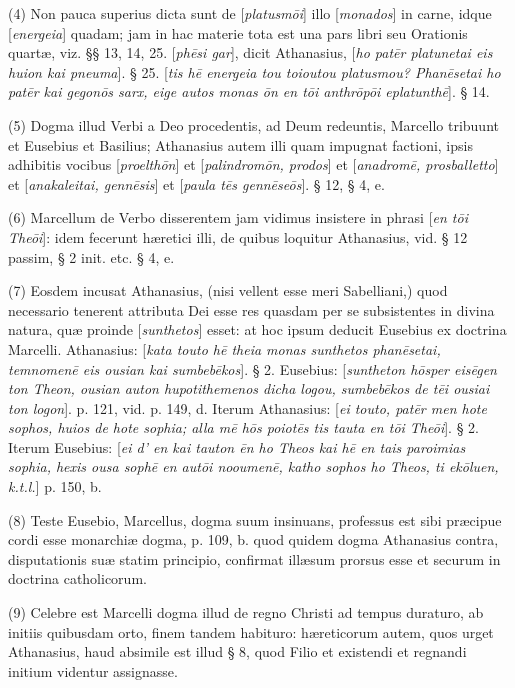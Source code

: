 (4)
Non pauca superius dicta sunt de [\emph{platusm\={o}i}] illo [\emph{monados}]
in carne, idque [\emph{energeia}] quadam; jam in hac materie tota est
una pars libri seu Orationis quartæ, viz. §§ 13, 14, 25. [\emph{ph\={e}si
gar}], dicit Athanasius, [\emph{ho pat\={e}r platunetai eis huion
kai pneuma}]. § 25. [\emph{tis h\={e} energeia tou toioutou
platusmou? Phan\={e}setai ho pat\={e}r kai gegon\={o}s sarx,
eige autos monas \={o}n en t\={o}i anthr\={o}p\={o}i
eplatunth\={e}}]. § 14.

(5)
Dogma illud Verbi a Deo procedentis, ad Deum redeuntis, Marcello
tribuunt et Eusebius et Basilius; Athanasius autem illi quam impugnat
factioni, ipsis adhibitis vocibus [\emph{proelth\={o}n}] et [\emph{palindrom\={o}n,
prodos}] et [\emph{anadrom\={e}, prosballetto}] et [\emph{anakaleitai,
genn\={e}sis}] et [\emph{paula t\={e}s genn\={e}se\={o}s}].
§ 12, § 4, e.

(6)
Marcellum de Verbo disserentem jam vidimus insistere in phrasi [\emph{en
t\={o}i The\={o}i}]: idem fecerunt hæretici illi, de
quibus loquitur Athanasius, vid. § 12 passim, § 2 init. etc. § 4,
e.

(7)
Eosdem incusat Athanasius, (nisi vellent esse meri Sabelliani,) quod
necessario tenerent attributa Dei esse res quasdam per se subsistentes
in divina natura, quæ proinde [\emph{sunthetos}] esset: at hoc ipsum
deducit Eusebius ex doctrina Marcelli. Athanasius: [\emph{kata touto h\={e}
theia monas sunthetos phan\={e}setai, temnomen\={e} eis ousian
kai sumbeb\={e}kos}]. § 2. Eusebius: [\emph{suntheton h\={o}sper
eis\={e}gen ton Theon, ousian auton hupotithemenos dicha logou,
sumbeb\={e}kos de t\={e}i ousiai ton logon}]. p. 121, vid. p.
149, d. Iterum Athanasius: [\emph{ei touto, pat\={e}r men hote sophos,
huios de hote sophia; alla m\={e} h\={o}s poiot\={e}s tis
tauta en t\={o}i The\={o}i}]. § 2. Iterum Eusebius: [\emph{ei d'
en kai tauton \={e}n ho Theos kai h\={e} en tais paroimias
sophia, hexis ousa soph\={e} en aut\={o}i nooumen\={e}, katho
sophos ho Theos, ti ek\={o}luen, k.t.l.}] p. 150, b.

(8)
Teste Eusebio, Marcellus, dogma suum insinuans, professus est sibi præcipue
cordi esse monarchiæ dogma, p. 109, b. quod quidem dogma Athanasius
contra, disputationis suæ statim principio, confirmat illæsum
prorsus esse et securum in doctrina catholicorum.

(9)
Celebre est Marcelli dogma illud de regno Christi ad tempus duraturo,
ab initiis quibusdam orto, finem tandem habituro: hæreticorum autem,
quos urget Athanasius, haud absimile est illud § 8, quod Filio et
existendi et regnandi initium videntur assignasse.

